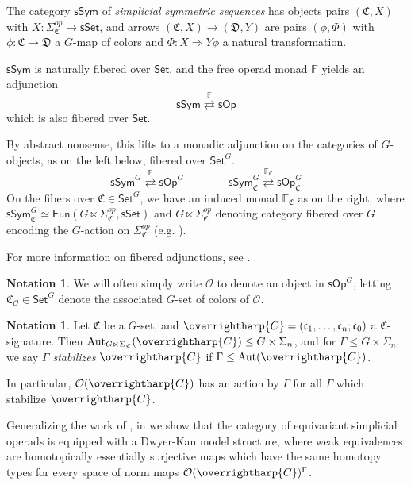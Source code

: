 \documentclass[a4paper,10pt
,draft
]{article}%
\numberwithin{equation}{section}
\numberwithin{figure}{section}
\theoremstyle{definition} %
\newtheorem{notation}[equation]{Notation}%
\newcommand{\vect}[1]{\text{\overrightharp{\ensuremath{#1}}}}
\newcommand{\Set}{\ensuremath{\mathsf{Set}}}
\newcommand{\sSet}{\ensuremath{\mathsf{sSet}}}%
\newcommand{\sOp}{\ensuremath{\mathsf{sOp}}}%
\newcommand{\sSym}{\ensuremath{\mathsf{sSym}}}%
\newcommand{\Fun}{\mathsf{Fun}}
\DeclareMathOperator{\Aut}{Aut}%
\renewcommand{\O}{\ensuremath{\mathcal O}}
\newcommand{\1}{\ensuremath{\mathbbm 1}}%
\begin{document}
The category $\mathsf{sSym}$ of \textit{simplicial symmetric sequences} has
objects pairs $(\mathfrak C, X)$ with $X \colon \Sigma_{\mathfrak C}^{op} \to \sSet$,
and arrows $(\mathfrak C, X) \to (\mathfrak D, Y)$ are pairs $(\phi, \Phi)$ with
$\phi \colon \mathfrak C \to \mathfrak D$ a $G$-map of colors and
$\Phi \colon X \Rightarrow Y \phi$ a natural transformation.

$\sSym$ is naturally fibered over $\Set$,
and the free operad monad $\mathbb F$ yields an adjunction
\[
      \sSym \overset{\mathbb F}{\rightleftarrows} \sOp
\]
which is also fibered over $\Set$.

By abstract nonsense, this lifts to a monadic adjunction on the categories of $G$-objects, as on the left below, fibered over $\Set^G$.
\[
      \sSym^G \overset{\mathbb F}{\rightleftarrows} \sOp^G
      \qquad \qquad
      \sSym^G_{\mathfrak C} \overset{\mathbb F_{\mathfrak C}}{\rightleftarrows} \sOp^G_{\mathfrak C}
\]
On the fibers over $\mathfrak C \in \Set^G$, we have
an induced monad $\mathbb F_{\mathfrak C}$ as on the right,
where $\sSym^G_{\mathfrak C} \simeq \Fun(G \ltimes \Sigma_{\mathfrak C}^{op}, \sSet)$ and
$G \ltimes \Sigma_{\mathfrak C}^{op}$ denoting category fibered over $G$ encoding the $G$-action on $\Sigma_{\mathfrak C}^{op}$ (e.g. \cite[Example 2.13]{BP_HGOP}).

For more information on fibered adjunctions, see \cite[\S 2.2]{BP_HGOP}.


\begin{notation}
      We will often simply write $\O$ to denote an object in $\sOp^G$,
      letting $\mathfrak C_\O \in \Set^G$ denote the associated $G$-set of colors of $\O$.
\end{notation}

\begin{notation}
      Let $\mathfrak C$ be a $G$-set, and $\vect C = (\mathfrak c_1, \dots, \mathfrak c_n; \mathfrak c_0)$ a $\mathfrak C$-signature.
      Then $\Aut_{G \ltimes \Sigma_{\mathfrak C}}(\vect C) \leq G \times \Sigma_n$,
      and for $\Gamma \leq G \times \Sigma_n$, we say \textit{$\Gamma$ stabilizes $\vect C$} if $\Gamma \leq \Aut(\vect C)$.

      In particular, $\O(\vect C)$ has an action by $\Gamma$ for all $\Gamma$ which stabilize $\vect C$.
\end{notation}

Generalizing the work of \cite{Ber07b,CM13b}, in \cite{BP_HGOP} we show that
the category of equivariant simplicial operads is equipped with a Dwyer-Kan model structure,
where weak equivalences are homotopically essentially surjective maps which have the same homotopy types for every space of norm maps $\O(\vect C)^\Gamma$.
\end{document}
